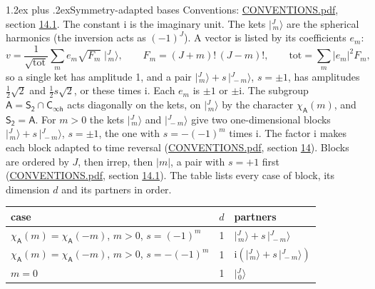 \documentclass[10pt,a4paper]{article}
\makeatletter
\renewcommand\section{\@startsection{section}{1}{\z@}{-3ex plus -1ex minus -.2ex}%
  {1.2ex plus .2ex}{\normalfont\large\sffamily\bfseries\color{parttitle}}}
\numberwithin{equation}{section}
\newcommand{\grp}[1]{\mathsf{#1}}
\newcommand{\iunit}{\mathrm{i}}
\newcommand{\chiA}{\chi_{\grp{A}}}
\newcommand{\jm}[2]{\bigl\lvert{}^{#1}_{\,#2}\bigr\rangle}
\makeatother
\begin{document}
\section{Symmetry-adapted bases}\label{s:bases}
Conventions: \href{../../CONVENTIONS.pdf}{CONVENTIONS.pdf}, section \href{../../CONVENTIONS.pdf\#conv.14.1}{14.1}.
The constant $\iunit$ is the imaginary unit.
\leavevmode\label{n:index.m}\label{n:vector.ket}The kets $\jm{J}{m}$ are the spherical harmonics (the inversion acts as $(-1)^J$). \label{n:index.ketcoefficient}\label{n:vector.basis.symmetry}\label{n:index.ketweight}\label{n:index.total}A vector is listed by its coefficients $e_m$:
\begin{equation}\label{e:ket}v = \frac{1}{\sqrt{\mathrm{tot}}}\sum_m e_m\sqrt{F_m}\;\jm{J}{m},\qquad F_m = (J+m)!\,(J-m)!,\qquad \mathrm{tot} = \sum_m |e_m|^2F_m,\end{equation}
\leavevmode\label{n:index.pair.sign}so a single ket has amplitude 1, and a pair $\jm{J}{m} + s\,\jm{J}{-m}$, $s = \pm1$, has amplitudes $\tfrac{1}{2}\sqrt{2}$ and $\tfrac{1}{2}s\sqrt{2}$, or these times $\iunit$. Each $e_m$ is $\pm1$ or $\pm\iunit$.
\leavevmode\label{n:group.A}\label{n:function.character.abelian}The subgroup $\grp{A} = \grp{S_{2}}\cap\grp{C_{\infty h}}$ acts diagonally on the kets, on $\jm{J}{m}$ by the character $\chiA(m)$, and $\grp{S_{2}} = \grp{A}$. For $m > 0$ the kets $\jm{J}{m}$ and $\jm{J}{-m}$ give two one-dimensional blocks $\jm{J}{m} + s\,\jm{J}{-m}$, $s = \pm1$, the one with $s = -(-1)^m$ times $\iunit$. The factor $\iunit$ makes each block adapted to time reversal (\href{../../CONVENTIONS.pdf}{CONVENTIONS.pdf}, section \href{../../CONVENTIONS.pdf\#conv.14}{14}). Blocks are ordered by $J$, then irrep, then $|m|$, a pair with $s = +1$ first (\href{../../CONVENTIONS.pdf}{CONVENTIONS.pdf}, section \href{../../CONVENTIONS.pdf\#conv.14.1}{14.1}).
\leavevmode\label{n:head.case}\label{n:head.partners}The table lists every case of block, its dimension $d$ and its partners in order.
\begin{center}\begin{tabular}{@{}lrl@{}}\toprule
case & $d$ & partners\\\midrule
$\chiA(m) = \chiA(-m)$, $m > 0$, $s = (-1)^m$ & 1 & $\jm{J}{m} + s\,\jm{J}{-m}$\\
$\chiA(m) = \chiA(-m)$, $m > 0$, $s = -(-1)^m$ & 1 & $\iunit(\jm{J}{m} + s\,\jm{J}{-m})$\\
$m = 0$ & 1 & $\jm{J}{0}$\\
\bottomrule\end{tabular}\end{center}
\end{document}
